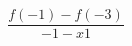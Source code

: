 \documentclass[preview]{standalone}
\begin{document}
\begin{align*}
\dfrac{f(-1) - f(-3)}{-1 - {x1}}
\end{align*}
\end{document}
